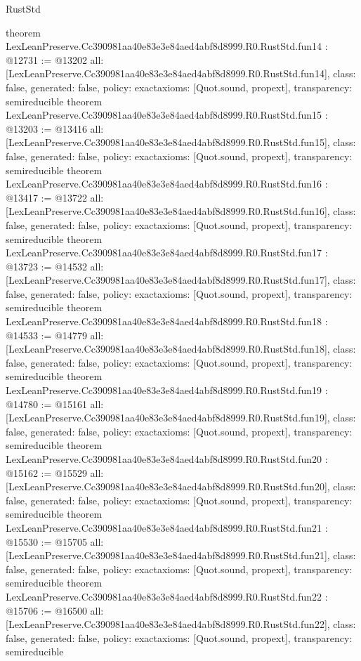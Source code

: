 \begin{lexlean}{RustStd}
\begin{coremodule}
{}
theorem LexLeanPreserve.Cc390981aa40e83e3e84aed4abf8d8999.R0.RustStd.fun14 : @12731 := @13202 {
  all: [LexLeanPreserve.Cc390981aa40e83e3e84aed4abf8d8999.R0.RustStd.fun14],
  class: false,
  generated: false,
  policy: exact{axioms: [Quot.sound, propext]},
  transparency: semireducible
}
theorem LexLeanPreserve.Cc390981aa40e83e3e84aed4abf8d8999.R0.RustStd.fun15 : @13203 := @13416 {
  all: [LexLeanPreserve.Cc390981aa40e83e3e84aed4abf8d8999.R0.RustStd.fun15],
  class: false,
  generated: false,
  policy: exact{axioms: [Quot.sound, propext]},
  transparency: semireducible
}
theorem LexLeanPreserve.Cc390981aa40e83e3e84aed4abf8d8999.R0.RustStd.fun16 : @13417 := @13722 {
  all: [LexLeanPreserve.Cc390981aa40e83e3e84aed4abf8d8999.R0.RustStd.fun16],
  class: false,
  generated: false,
  policy: exact{axioms: [Quot.sound, propext]},
  transparency: semireducible
}
theorem LexLeanPreserve.Cc390981aa40e83e3e84aed4abf8d8999.R0.RustStd.fun17 : @13723 := @14532 {
  all: [LexLeanPreserve.Cc390981aa40e83e3e84aed4abf8d8999.R0.RustStd.fun17],
  class: false,
  generated: false,
  policy: exact{axioms: [Quot.sound, propext]},
  transparency: semireducible
}
theorem LexLeanPreserve.Cc390981aa40e83e3e84aed4abf8d8999.R0.RustStd.fun18 : @14533 := @14779 {
  all: [LexLeanPreserve.Cc390981aa40e83e3e84aed4abf8d8999.R0.RustStd.fun18],
  class: false,
  generated: false,
  policy: exact{axioms: [Quot.sound, propext]},
  transparency: semireducible
}
theorem LexLeanPreserve.Cc390981aa40e83e3e84aed4abf8d8999.R0.RustStd.fun19 : @14780 := @15161 {
  all: [LexLeanPreserve.Cc390981aa40e83e3e84aed4abf8d8999.R0.RustStd.fun19],
  class: false,
  generated: false,
  policy: exact{axioms: [Quot.sound, propext]},
  transparency: semireducible
}
theorem LexLeanPreserve.Cc390981aa40e83e3e84aed4abf8d8999.R0.RustStd.fun20 : @15162 := @15529 {
  all: [LexLeanPreserve.Cc390981aa40e83e3e84aed4abf8d8999.R0.RustStd.fun20],
  class: false,
  generated: false,
  policy: exact{axioms: [Quot.sound, propext]},
  transparency: semireducible
}
theorem LexLeanPreserve.Cc390981aa40e83e3e84aed4abf8d8999.R0.RustStd.fun21 : @15530 := @15705 {
  all: [LexLeanPreserve.Cc390981aa40e83e3e84aed4abf8d8999.R0.RustStd.fun21],
  class: false,
  generated: false,
  policy: exact{axioms: [Quot.sound, propext]},
  transparency: semireducible
}
theorem LexLeanPreserve.Cc390981aa40e83e3e84aed4abf8d8999.R0.RustStd.fun22 : @15706 := @16500 {
  all: [LexLeanPreserve.Cc390981aa40e83e3e84aed4abf8d8999.R0.RustStd.fun22],
  class: false,
  generated: false,
  policy: exact{axioms: [Quot.sound, propext]},
  transparency: semireducible
}
\end{coremodule}
\end{lexlean}
